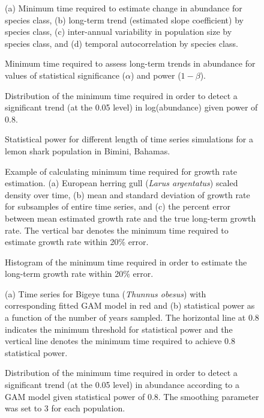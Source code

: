 \documentclass[12pt,]{article}
\begin{document}
\begin{figure}[htbp]
\centering
\caption{(a) Minimum time required to estimate change in abundance for
species class, (b) long-term trend (estimated slope coefficient) by
species class, (c) inter-annual variability in population size by species
class, and (d) temporal autocorrelation by species
class.\label{fig:class}}
\end{figure}

\begin{figure}[htbp]
\centering
\caption{Minimum time required to assess long-term trends in abundance
for values of statistical significance (\(\alpha\)) and power
(\(1-\beta\)).\label{fig:min_time_vs_alpha_beta}}
\end{figure}

\begin{figure}[htbp]
\centering
\caption{Distribution of the minimum time required in order to detect a
significant trend (at the 0.05 level) in log(abundance) given power of
0.8.\label{fig:min_time_dist_log_pop}}
\end{figure}

\begin{figure}[htbp]
\centering
\caption{Statistical power for different length of time series
simulations for a lemon shark population in Bimini,
Bahamas.\label{fig:shark_example}}
\end{figure}

\begin{figure}[htbp]
\centering
\caption{Example of calculating minimum time required for growth rate
estimation. (a) European herring gull (\emph{Larus argentatus}) scaled
density over time, (b) mean and standard deviation of growth rate for
subsamples of entire time series, and (c) the percent error between mean
estimated growth rate and the true long-term growth rate. The vertical
bar denotes the minimum time required to estimate growth rate within
20\% error.\label{fig:growth_rate}}
\end{figure}

\begin{figure}[htbp]
\centering
\caption{Histogram of the minimum time required in order to estimate the
long-term growth rate within 20\%
error.\label{fig:min_time_growth_dist}}
\end{figure}

\begin{figure}[htbp]
\centering
\caption{(a) Time series for Bigeye tuna (\emph{Thunnus obesus}) with
corresponding fitted GAM model in red and (b) statistical power as a
function of the number of years sampled. The horizontal line at 0.8
indicates the minimum threshold for statistical power and the vertical
line denotes the minimum time required to achieve 0.8 statistical
power.\label{fig:gam_example}}
\end{figure}

\begin{figure}[htbp]
\centering
\caption{Distribution of the minimum time required in order to detect a
significant trend (at the 0.05 level) in abundance according to a GAM
model given statistical power of 0.8. The smoothing parameter was set to
3 for each population.\label{fig:min_time_dist_gam}}
\end{figure}
\end{document}

